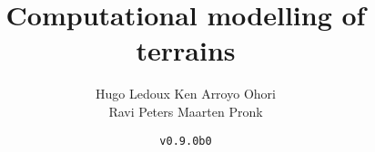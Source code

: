 \documentclass[
  fontsize=10pt, %
  twoside=true, %
  secnumdepth=1, %
  numbers=noenddot, %
]{kaobook}
\begin{document}


\title{Computational modelling of terrains}
\author{Hugo Ledoux \hspace{10mm} Ken Arroyo Ohori\\ Ravi Peters \hspace{17mm} Maarten Pronk}
\date{\texttt{v0.9.0b0}}

\publishers{\vspace{15mm}\texttt{[image: front-back/nl\_joydivision.png]}}


\frontmatter %










\maketitle
{}
\end{document}
